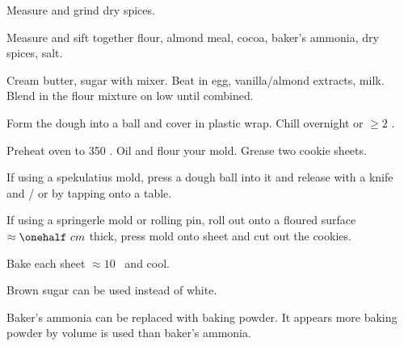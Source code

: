 \begin{preparation}
\item Measure and grind dry spices.

\item Measure and sift together flour, almond meal, cocoa, baker's ammonia, dry spices, salt.

\item Cream butter, sugar with mixer.
	Beat in egg, vanilla/almond extracts, milk.
	Blend in the flour mixture on low until combined.

\item Form the dough into a ball and cover in plastic wrap.
	Chill overnight or $\ge 2$ \hour.

\item Preheat oven to 350 \Fahrenheit.
	Oil and flour your mold.
	Grease two cookie sheets.

\item If using a spekulatius mold, press a dough ball into it and release with a knife and / or by tapping onto a table.

\item If using a springerle mold or rolling pin, roll out onto a floured surface $\approx \onehalf~cm$ thick, press mold onto sheet and cut out the cookies.

\item Bake each sheet $\approx 10$ \minute~and cool.
\end{preparation}

\begin{variation}
\item Brown sugar can be used instead of white.
\end{variation}

\begin{experiments}
\item Baker's ammonia can be replaced with baking powder.
	It appears more baking powder by volume is used than baker's ammonia.
\end{experiments}


\recipeend
